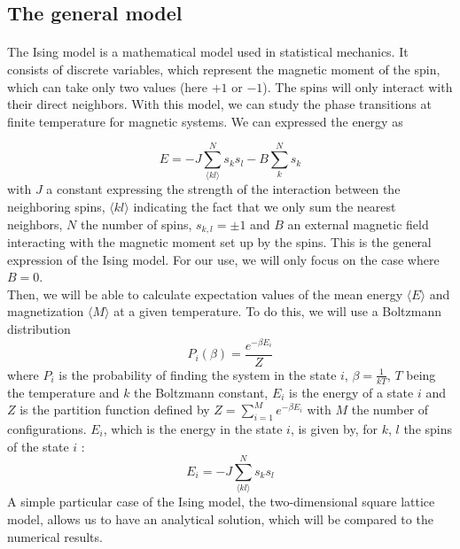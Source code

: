 \documentclass[a4paper, twoside, 11pt]{report}
\theoremstyle{theorem}
\theoremstyle{remark}
\theoremstyle{exemple}
\begin{document}
        \subsection{The general model}
        
            \paragraph{}The Ising model is a mathematical model used in statistical mechanics. It consists of discrete variables, which represent the magnetic moment of the spin, which can take only two values (here $+1$ or $-1$). The spins will only interact with their direct neighbors. With this model, we can study the phase transitions at finite temperature for magnetic systems. We can expressed the energy as 
                
                \begin{equation*}
                    E = -J \sum\limits_{\langle  kl\rangle}^{N}s_ks_l - B \sum\limits_{k}^{N}s_k
                    \tag{1}
                \end{equation*}
            with $J$ a constant expressing the strength of the interaction between the neighboring spins, $\langle kl \rangle$ indicating the fact that we only sum the nearest neighbors, $N$ the number of spins, $s_{k,l} = \pm 1$ and $B$ an external magnetic field interacting with the magnetic moment set up by the spins. This is the general expression of the Ising model. For our use, we will only focus on the case where $B=0$. \\
            Then, we will be able to calculate expectation values of the mean energy $\langle E \rangle$ and magnetization $\langle M \rangle$ at a given temperature. To do this, we will use a Boltzmann distribution
                \begin{equation*}
                    P_i(\beta) = \frac{e^{-\beta E_i}}{Z}
                    \tag{2}
                \end{equation*}
            where $P_i$ is the probability of finding the system in the state $i$, $\beta = \frac{1}{kT}$, $T$ being the temperature and $k$ the Boltzmann constant, $E_i$ is the energy of a state $i$ and $Z$ is the partition function defined by $\displaystyle Z = \sum\limits_{i=1}^{M}e^{-\beta E_i}$ with $M$ the number of configurations. $E_i$, which is the energy in the state $i$, is given by, for $k$, $l$ the spins of the state $i$ : 
                \begin{equation*}
                    E_i = -J \sum\limits_{\langle kl \rangle}^{N}s_ks_l 
                    \tag{3}
                \end{equation*} 
            A simple particular case of the Ising model, the two-dimensional square lattice model, allows us to have an analytical solution, which will be compared to the numerical results.
        
\end{document}
